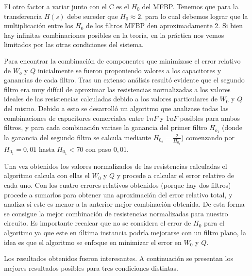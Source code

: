 \documentclass[11pt,a4paper]{report}
\begin{document}
\bigskip
El otro factor a variar junto con el C es el $H_{0}$ del MFBP. Tenemos que para la transferencia $H(s)$ debe suceder que $H_{0} \approx 2$, para lo cual debemos lograr que la multiplicación entre los $H_{0}$ de los filtros MFBP den aproximadamente 2. Si bien hay infinitas combinaciones posibles en la teoría, en la práctica nos vemos limitados por las otras condiciones del sistema. 

\bigskip
Para encontrar la combinación de componentes que minimizase el error relativo de $W_{o}$ y $Q$ inicialmente se fueron proponiendo valores a los capacitores y ganancias de cada filtro. Tras un extenso análisis resultó evidente que el segundo filtro era muy difícil de aproximar las resistencias normalizadas a los valores ideales de las resistencias calculadas debido a los valores particulares de $W_{0}$ y $Q$ del mismo. Debido a esto se desarrolló un algoritmo que analizase todas las combinaciones de capacitores comerciales entre $1nF$ y $1uF$ posibles para ambos filtros, y para cada combinación variase la ganancia del primer filtro $H_{o_{1}}$ (donde la ganancia del segundo filtro se calcula mediante $H_{0_{2}} = \frac{2}{H_{0_{1}}}$) comenzando por $H_{0_{1}} = 0,01$ hasta $H_{0_{1}} < 70$ con paso $0,01$. 

\bigskip
Una vez obtenidos los valores normalizados de las resistencias calculadas el algoritmo calcula con ellas el $W_{0}$ y $Q$ y procede a calcular el error relativo de cada uno. Con los cuatro errores relativos obtenidos (porque hay dos filtros) procede a sumarlos para obtener una aproximación del error relativo total, y analiza si este es menor a la anterior mejor combinación obtenida. De esta forma se consigue la mejor combinación de resistencias normalizadas para nuestro circuito.
Es importante recalcar que no se considera el error de $H_{0}$ para el algoritmo ya que este en última instancia podría mejorarse con un filtro plano, la idea es que el algoritmo se enfoque en minimizar el error en $W_{0}$ y $Q$.

\bigskip
Los resultados obtenidos fueron interesantes. A continuación se presentan los mejores resultados posibles para tres condiciones distintas.
\end{document}
